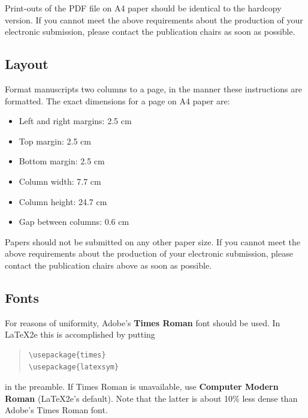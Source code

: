\documentclass[11pt,a4paper]{article}
\begin{document}
Print-outs of the PDF file on A4 paper should be identical to the
hardcopy version. If you cannot meet the above requirements about the
production of your electronic submission, please contact the
publication chairs as soon as possible.

\subsection{Layout}
\label{ssec:layout}

Format manuscripts two columns to a page, in the manner these
instructions are formatted. The exact dimensions for a page on A4
paper are:

\begin{itemize}
\item Left and right margins: 2.5 cm
\item Top margin: 2.5 cm
\item Bottom margin: 2.5 cm
\item Column width: 7.7 cm
\item Column height: 24.7 cm
\item Gap between columns: 0.6 cm
\end{itemize}

\noindent Papers should not be submitted on any other paper size.
 If you cannot meet the above requirements about the production of 
 your electronic submission, please contact the publication chairs 
 above as soon as possible.

\subsection{Fonts}

For reasons of uniformity, Adobe's {\bf Times Roman} font should be
used. In \LaTeX2e{} this is accomplished by putting

\begin{quote}
\begin{verbatim}
\usepackage{times}
\usepackage{latexsym}
\end{verbatim}
\end{quote}
in the preamble. If Times Roman is unavailable, use {\bf Computer
  Modern Roman} (\LaTeX2e{}'s default).  Note that the latter is about
  10\% less dense than Adobe's Times Roman font.
\end{document}
